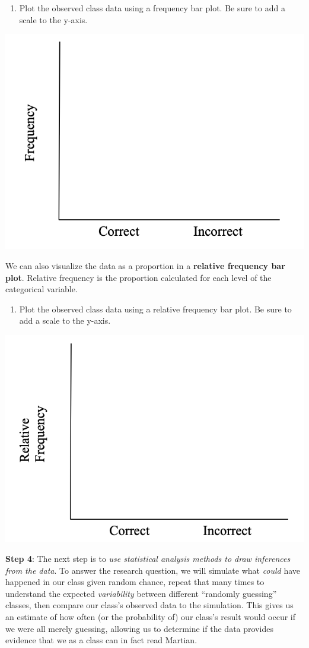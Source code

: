 \documentclass[
]{report}
\providecommand{\tightlist}{%
  \setlength{\itemsep}{0pt}\setlength{\parskip}{0pt}}
\begin{document}
\begin{enumerate}
\def\labelenumi{\arabic{enumi}.}
\setcounter{enumi}{6}
\tightlist
\item
  Plot the observed class data using a frequency bar plot. Be sure to add a scale to the y-axis.
\end{enumerate}

\begin{center}\includegraphics[width=0.4\linewidth]{images/barplot_martian} \end{center}

We can also visualize the data as a proportion in a \textbf{relative frequency bar plot}. Relative frequency is the proportion calculated for each level of the categorical variable.

\begin{enumerate}
\def\labelenumi{\arabic{enumi}.}
\setcounter{enumi}{7}
\tightlist
\item
  Plot the observed class data using a relative frequency bar plot. Be sure to add a scale to the y-axis.
\end{enumerate}

\begin{center}\includegraphics[width=0.4\linewidth]{images/relative_barplot_martian} \end{center}

\newpage

\textbf{Step 4}: The next step is to \emph{use statistical analysis methods to draw inferences from the data}. To answer the research question, we will simulate what \emph{could} have happened in our class given random chance, repeat that many times to understand the expected \emph{variability} between different ``randomly guessing'' classes, then compare our class's observed data to the simulation. This gives us an estimate of how often (or the probability of) our class's result would occur if we were all merely guessing, allowing us to determine if the data provides evidence that we as a class can in fact read Martian.
\end{document}
